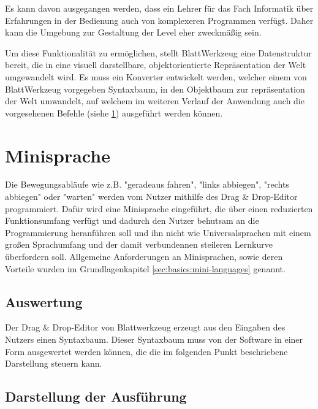 Es kann davon ausgegangen werden, dass ein Lehrer für das Fach Informatik über Erfahrungen in der Bedienung auch von komplexeren Programmen verfügt. Daher kann die Umgebung zur Gestaltung der Level eher zweckmäßig sein.

Um diese Funktionalität zu ermöglichen, stellt BlattWerkzeug eine Datenstruktur bereit, die in eine visuell darstellbare, objektorientierte Repräsentation der Welt umgewandelt wird. Es muss ein Konverter entwickelt werden, welcher einem von BlattWerkzeug vorgegeben Syntaxbaum, in den Objektbaum zur repräsentation der Welt umwandelt, auf welchem im weiteren Verlauf der Anwendung auch die vorgesehenen Befehle (siehe \ref{sec:requirements:program}) ausgeführt werden können.

\section{Minisprache}
\label{sec:requirements:program}

Die Bewegungsabläufe wie z.B. "geradeaus fahren", "links abbiegen", "rechts abbiegen" oder "warten" werden vom Nutzer mithilfe des Drag \& Drop-Editor programmiert. Dafür wird eine Minisprache eingeführt, die über einen reduzierten Funktionsumfang verfügt und dadurch den Nutzer behutsam an die Programmierung heranführen soll und ihn nicht wie Universalsprachen mit einem großen Sprachumfang und der damit verbundennen steileren Lernkurve überfordern soll. Allgemeine Anforderungen an Minisprachen, sowie deren Vorteile wurden im Grundlagenkapitel \ref{sec:basics:mini-languages} genannt.

\subsection{Auswertung}
\label{sec:requirements:world:compile-interpret}

Der Drag \& Drop-Editor von Blattwerkzeug  erzeugt aus den Eingaben des Nutzers einen Syntaxbaum. Dieser Syntaxbaum muss von der Software in einer Form ausgewertet werden können, die die im folgenden Punkt beschriebene Darstellung steuern kann.

\subsection{Darstellung der Ausführung}
\label{sec:requirements:world:display}

